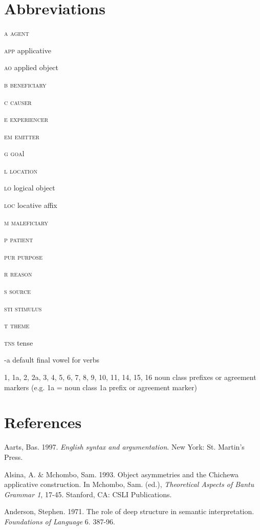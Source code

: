 \documentclass[output=paper]{langsci/langscibook}
\begin{document}
\section{ Abbreviations}

\textsc{a}    \textsc{agent}

\textsc{app}    applicative

\textsc{ao}    applied object 

\textsc{b}    \textsc{beneficiary}

\textsc{c}    \textsc{causer}

\textsc{e}     \textsc{experiencer}

\textsc{em}    \textsc{emitter}

\textsc{g}    \textsc{goa}l

\textsc{l}    \textsc{location}

\textsc{lo}    logical object 

\textsc{loc}    locative affix

\textsc{m}    \textsc{maleficiary}

\textsc{p}     \textsc{patient}

\textsc{pur    }\textsc{purpose }

\textsc{r}    \textsc{reason}

\textsc{s}    \textsc{source}

\textsc{sti}    \textsc{stimulus}

\textsc{t}    \textsc{theme}

\textsc{tns}    tense 

{}-a    default final vowel for verbs

1, 1a, 2, 2a, 3, 4, 5, 6, 7, 8, 9, 10, 11, 14, 15, 16 noun class prefixes or agreement markers (e.g. 1a = noun class 1a prefix or agreement marker)

\section{ References}

Aarts, Bas. 1997. \textit{English syntax and argumentation}. New York: St. Martin's Press.

Alsina, A. \& Mchombo, Sam. 1993. Object asymmetries and the Chichewa applicative construction. In Mchombo, Sam. (ed.), \textit{Theoretical Aspects of Bantu Grammar 1}, 17-45. Stanford, CA: CSLI Publications.

Anderson, Stephen. 1971. The role of deep structure in semantic interpretation. \textit{Foundations of Language }6. 387-96.
\end{document}
